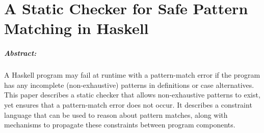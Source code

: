 \documentclass[book]{tfp05symp}
\begin{document}
\pagestyle{plain}


\setcounter{chapter}{1} \setcounter{page}{15}


\chapter{A Static Checker for Safe Pattern Matching in Haskell}



\addtocounter{footnote}{1}







\paragraph{Abstract:}
A Haskell program may fail at runtime with a pattern-match error if
the program has any incomplete (non-exhaustive) patterns in
definitions or case alternatives. This paper describes a static
checker that allows non-exhaustive patterns to exist, yet ensures
that a pattern-match error does not occur. It describes a constraint
language that can be used to reason about pattern matches, along
with mechanisms to propagate these constraints between program
components.
\end{document}
